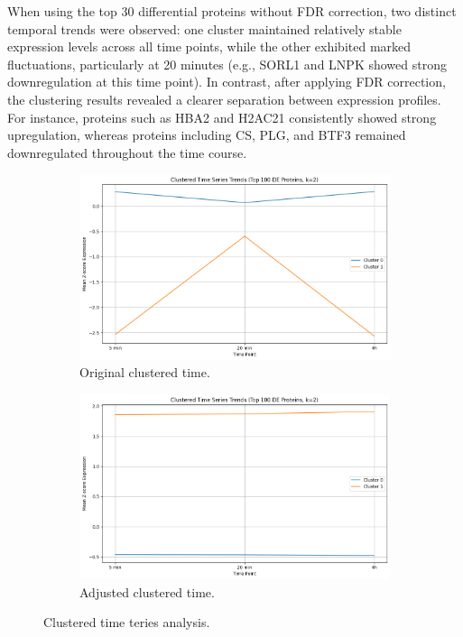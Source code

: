 \documentclass{article}
\begin{document}
      When using the top 30 differential proteins without FDR correction, two distinct temporal trends were observed: one cluster maintained relatively stable expression levels across all time points, while the other exhibited marked fluctuations, particularly at 20 minutes (e.g., SORL1 and LNPK showed strong downregulation at this time point). In contrast, after applying FDR correction, the clustering results revealed a clearer separation between expression profiles. For instance, proteins such as HBA2 and H2AC21 consistently showed strong upregulation, whereas proteins including CS, PLG, and BTF3 remained downregulated throughout the time course. 
      
      \begin{figure}[H]
        \centering
        \begin{subfigure}{0.45\textwidth}
            \includegraphics[width=\linewidth]{figures/clustered_time_teries.png}
            \caption{Original clustered time.}
            \label{fig:clustered_time_teries}
        \end{subfigure}
        \hfill
        \begin{subfigure}{0.45\textwidth}
            \includegraphics[width=\linewidth]{figures/clustered_time_teries_fdr.png}
            \caption{Adjusted clustered time.}
            \label{fig:clustered_time_teries_fdr}
        \end{subfigure}
        \caption{Clustered time teries analysis.}
        \label{fig:clustered_time_teries_all}
      \end{figure}
      
\end{document}
